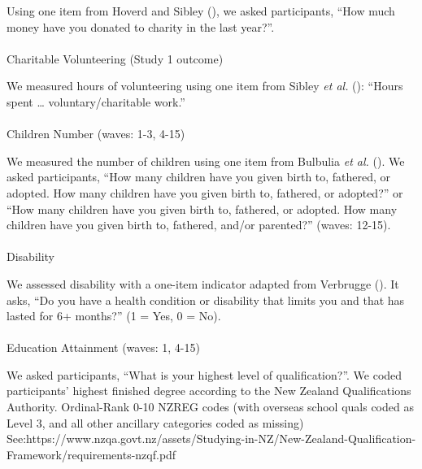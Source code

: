 \documentclass[
  single column]{article}
\makeatletter
\let\oldparagraph\paragraph
\renewcommand{\paragraph}{
    \@ifstar
      \xxxParagraphStar
      \xxxParagraphNoStar
  }
\newcommand{\xxxParagraphStar}[1]{\oldparagraph*{#1}\mbox{}}
\newcommand{\xxxParagraphNoStar}[1]{\oldparagraph{#1}\mbox{}}
\makeatother
\begin{document}
Using one item from Hoverd and Sibley
(), we asked participants,
``How much money have you donated to charity in the last year?''.

\paragraph{Charitable Volunteering (Study 1
outcome)}\label{charitable-volunteering-study-1-outcome}

We measured hours of volunteering using one item from Sibley \emph{et
al.} (): ``Hours spent \ldots{}
voluntary/charitable work.''

\paragraph{Children Number (waves: 1-3,
4-15)}\label{children-number-waves-1-3-4-15}

We measured the number of children using one item from Bulbulia \emph{et
al.} (). We asked participants, ``How
many children have you given birth to, fathered, or adopted. How many
children have you given birth to, fathered, or adopted?'' or ``How many
children have you given birth to, fathered, or adopted. How many
children have you given birth to, fathered, and/or parented?'' (waves:
12-15).

\paragraph{Disability}\label{disability}

We assessed disability with a one-item indicator adapted from Verbrugge
(). It asks, ``Do you have a health
condition or disability that limits you and that has lasted for 6+
months?'' (1 = Yes, 0 = No).

\paragraph{Education Attainment (waves: 1,
4-15)}\label{education-attainment-waves-1-4-15}

We asked participants, ``What is your highest level of qualification?''.
We coded participants' highest finished degree according to the New
Zealand Qualifications Authority. Ordinal-Rank 0-10 NZREG codes (with
overseas school quals coded as Level 3, and all other ancillary
categories coded as missing)
See:https://www.nzqa.govt.nz/assets/Studying-in-NZ/New-Zealand-Qualification-Framework/requirements-nzqf.pdf
\end{document}
